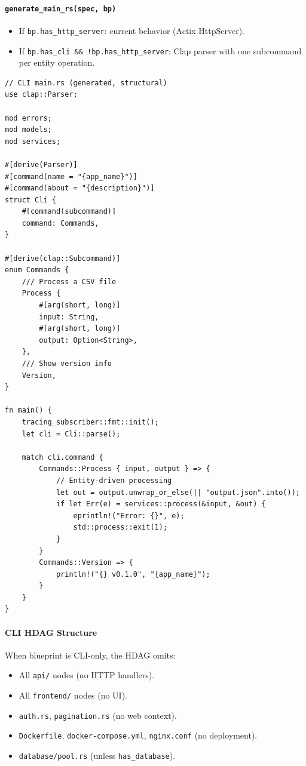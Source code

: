 \documentclass[11pt,a4paper]{article}
\begin{document}
\paragraph{\texttt{generate\_main\_rs(spec, bp)}}

\begin{itemize}[nosep]
\item If \texttt{bp.has\_http\_server}: current behavior 
      (Actix HttpServer).
\item If \texttt{bp.has\_cli \&\& !bp.has\_http\_server}: Clap 
      parser with one subcommand per entity operation.
\end{itemize}

\begin{lstlisting}[style=rust]
// CLI main.rs (generated, structural)
use clap::Parser;

mod errors;
mod models;
mod services;

#[derive(Parser)]
#[command(name = "{app_name}")]
#[command(about = "{description}")]
struct Cli {
    #[command(subcommand)]
    command: Commands,
}

#[derive(clap::Subcommand)]
enum Commands {
    /// Process a CSV file
    Process {
        #[arg(short, long)]
        input: String,
        #[arg(short, long)]
        output: Option<String>,
    },
    /// Show version info
    Version,
}

fn main() {
    tracing_subscriber::fmt::init();
    let cli = Cli::parse();
    
    match cli.command {
        Commands::Process { input, output } => {
            // Entity-driven processing
            let out = output.unwrap_or_else(|| "output.json".into());
            if let Err(e) = services::process(&input, &out) {
                eprintln!("Error: {}", e);
                std::process::exit(1);
            }
        }
        Commands::Version => {
            println!("{} v0.1.0", "{app_name}");
        }
    }
}
\end{lstlisting}

\paragraph{CLI HDAG Structure}

When blueprint is CLI-only, the HDAG omits:
\begin{itemize}[nosep]
\item All \texttt{api/} nodes (no HTTP handlers).
\item All \texttt{frontend/} nodes (no UI).
\item \texttt{auth.rs}, \texttt{pagination.rs} (no web context).
\item \texttt{Dockerfile}, \texttt{docker-compose.yml}, 
      \texttt{nginx.conf} (no deployment).
\item \texttt{database/pool.rs} (unless \texttt{has\_database}).
\end{itemize}
\end{document}
